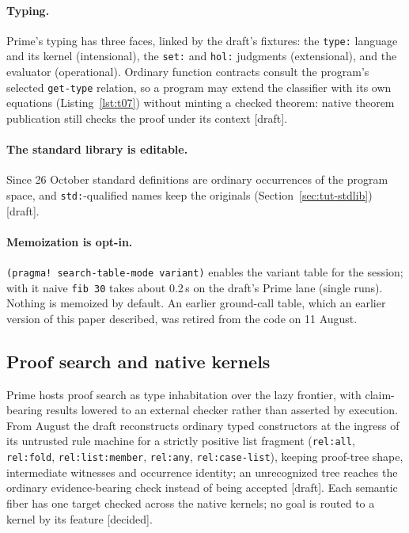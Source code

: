 \documentclass[11pt]{article}
\newcommand{\code}[1]{\texttt{#1}}
\newcommand{\kind}[1]{\textsf{\small[#1]}}
\begin{document}
\paragraph{Typing.}  Prime's typing has three faces, linked by the draft's
fixtures: the \code{type:} language and its kernel (intensional), the
\code{set:} and \code{hol:} judgments (extensional), and the evaluator
(operational).  Ordinary function contracts consult the program's selected
\code{get-type} relation, so a program may extend the classifier with its own
equations (Listing~\ref{lst:t07}) without minting a checked theorem: native
theorem publication still checks the proof under its context \kind{draft}.

\paragraph{The standard library is editable.}  Since 26 October standard
definitions are ordinary occurrences of the program space, and
\code{std:}-qualified names keep the originals (Section~\ref{sec:tut-stdlib})
\kind{draft}.

\paragraph{Memoization is opt-in.}  \code{(pragma! search-table-mode variant)}
enables the variant table for the session; with it naive \code{fib 30} takes
about 0.2\,s on the draft's Prime lane (single runs).  Nothing is memoized by
default.  An earlier ground-call table, which an earlier version of this paper
described, was retired from the code on 11 August.

\subsection{Proof search and native kernels}

Prime hosts proof search as type inhabitation over the lazy frontier, with
claim-bearing results lowered to an external checker rather than asserted by
execution.  From August the draft reconstructs ordinary typed constructors at
the ingress of its untrusted rule machine for a strictly positive list
fragment (\code{rel:all}, \code{rel:fold}, \code{rel:list:member},
\code{rel:any}, \code{rel:case-list}), keeping proof-tree shape, intermediate
witnesses and occurrence identity; an unrecognized tree reaches the ordinary
evidence-bearing check instead of being accepted \kind{draft}.  Each
semantic fiber has one target checked across the native kernels; no goal is
routed to a kernel by its feature \kind{decided}.
\end{document}

